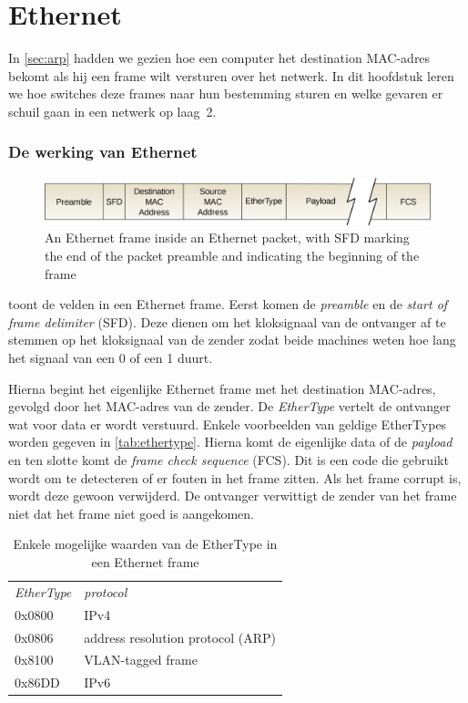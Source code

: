 \chapter{Ethernet}
\label{sec:ethernet}

In \vref{sec:arp} hadden we gezien hoe een computer het destination MAC-adres bekomt als hij een frame wilt versturen over het netwerk.
In dit hoofdstuk leren we hoe switches deze frames naar hun bestemming sturen en welke gevaren er schuil gaan in een netwerk op laag~2.

\subsection{De werking van Ethernet}


\begin{figure}[hbp]
    \centering
    \includegraphics[width=\textwidth]{images/Ethernet_frame.png}
    \caption{An Ethernet frame inside an Ethernet packet, with SFD marking the end of the packet preamble and indicating the beginning of the frame}
    \label{fig:ethernet-frame}
\end{figure}


 toont de velden in een Ethernet frame.
Eerst komen de \emph{preamble} en de \emph{start of frame delimiter} (SFD).
Deze dienen om het kloksignaal van de ontvanger af te stemmen op het kloksignaal van de zender zodat beide machines weten hoe lang het signaal van een 0 of een 1 duurt.

Hierna begint het eigenlijke Ethernet frame met het destination MAC-adres, gevolgd door het MAC-adres van de zender.
De \emph{EtherType} vertelt de ontvanger wat voor data er wordt verstuurd.
Enkele voorbeelden van geldige EtherTypes worden gegeven in \vref{tab:ethertype}.
Hierna komt de eigenlijke data of de \emph{payload} en ten slotte komt de \emph{frame check sequence} (FCS).
Dit is een code die gebruikt wordt om te detecteren of er fouten in het frame zitten.
Als het frame corrupt is, wordt deze gewoon verwijderd.
De ontvanger verwittigt de zender van het frame niet dat het frame niet goed is aangekomen.

\begin{table}[htp]
    \centering
    \begin{tabular}{ll}
    \textit{EtherType} & \textit{protocol} \\[1ex]
    0x0800 & IPv4 \\
    0x0806 & address resolution protocol (ARP) \\
    0x8100 & VLAN-tagged frame \\
    0x86DD & IPv6 \\
    \end{tabular}
    \caption{Enkele mogelijke waarden van de EtherType in een Ethernet frame}
    \label{tab:ethertype}
\end{table}


